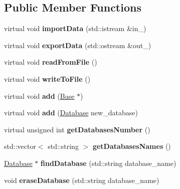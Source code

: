 \subsection*{Public Member Functions}
\begin{DoxyCompactItemize}
\item 
\mbox{\label{class_databases_list_abd187b9e0cf5551d63bcd76d97cd792e}} 
virtual void {\bfseries import\+Data} (std\+::istream \&in\+\_\+)
\item 
\mbox{\label{class_databases_list_a0dc8aa3a016c4f466a3625f897d4b79a}} 
virtual void {\bfseries export\+Data} (std\+::ostream \&out\+\_\+)
\item 
\mbox{\label{class_databases_list_ada9be7bc8acb9bfe0ca59b3dc515afa7}} 
virtual void {\bfseries read\+From\+File} ()
\item 
\mbox{\label{class_databases_list_a2e64d5ee70b19c3056a63823c0191070}} 
virtual void {\bfseries write\+To\+File} ()
\item 
\mbox{\label{class_databases_list_a36e4a59130a119f44e3ae18870d1a691}} 
virtual void {\bfseries add} (\mbox{\hyperlink{class_base}{Base}} $\ast$)
\item 
\mbox{\label{class_databases_list_a97a1a3e49fb1644ab07999dc332a0efa}} 
virtual void {\bfseries add} (\mbox{\hyperlink{class_database}{Database}} new\+\_\+database)
\item 
\mbox{\label{class_databases_list_a86f5b675c610750ba64ae1f494df687f}} 
virtual unsigned int {\bfseries get\+Databases\+Number} ()
\item 
\mbox{\label{class_databases_list_a054378c1becba066855c2daee11fbec7}} 
std\+::vector$<$ std\+::string $>$ {\bfseries get\+Databases\+Names} ()
\item 
\mbox{\label{class_databases_list_afcbaa3e3e622bd99276dfce327469e07}} 
\mbox{\hyperlink{class_database}{Database}} $\ast$ {\bfseries find\+Database} (std\+::string database\+\_\+name)
\item 
\mbox{\label{class_databases_list_a48895e73772682d7a18ca170ff520068}} 
void {\bfseries erase\+Database} (std\+::string database\+\_\+name)
\end{DoxyCompactItemize}
